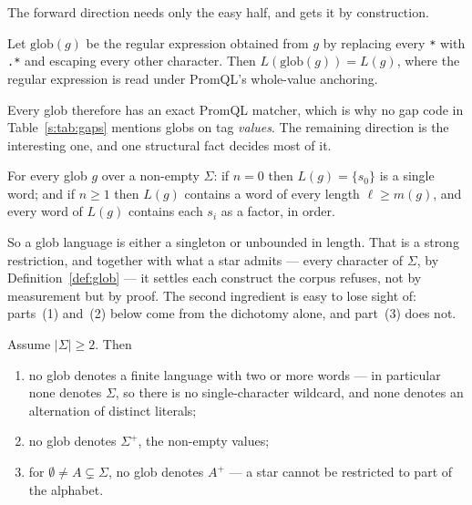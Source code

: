 The forward direction needs only the easy half, and gets it by construction.

\begin{proposition}\label{prop:glob-regex}
Let $\mathrm{glob}(g)$ be the regular expression obtained from $g$ by replacing every
\texttt{*} with \texttt{.*} and escaping every other character. Then
$L(\mathrm{glob}(g))=L(g)$, where the regular expression is read under PromQL's
whole-value anchoring.
\end{proposition}



\noindent
Every glob therefore has an exact PromQL matcher, which is why no gap code in
Table~\ref{s:tab:gaps} mentions globs on tag \emph{values}. The remaining direction is
the interesting one, and one structural fact decides most of it.

\begin{lemma}[Dichotomy]\label{lem:dichotomy}
For every glob $g$ over a non-empty $\Sigma$: if $n=0$ then $L(g)=\{s_0\}$ is a single
word; and if $n\ge 1$ then $L(g)$ contains a word of every length $\ell\ge m(g)$, and
every word of $L(g)$ contains each $s_i$ as a factor, in order.
\end{lemma}



\noindent
So a glob language is either a singleton or unbounded in length. That is a strong
restriction, and together with what a star admits --- every character of $\Sigma$, by
Definition~\ref{def:glob} --- it settles each construct the corpus refuses, not by
measurement but by proof. The second ingredient is easy to lose sight of: parts~(1)
and~(2) below come from the dichotomy alone, and part~(3) does not.

\begin{corollary}\label{cor:no-glob}
Assume $|\Sigma|\ge 2$. Then
\begin{enumerate}
\item no glob denotes a finite language with two or more words --- in particular none
denotes $\Sigma$, so there is no single-character wildcard, and none denotes an
alternation of distinct literals;
\item no glob denotes $\Sigma^{+}$, the non-empty values;
\item for $\emptyset\neq A\subsetneq\Sigma$, no glob denotes $A^{+}$ --- a star cannot be
restricted to part of the alphabet.
\end{enumerate}
\end{corollary}

